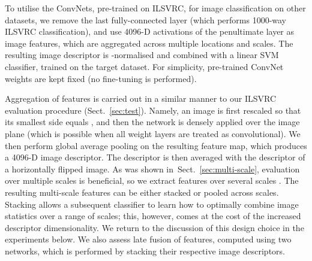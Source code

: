 \documentclass{article} \usepackage{iclr2015,times}
\newcommand{\sref}[1]{Sect.~\ref{#1}}
\begin{document}
To utilise the ConvNets, pre-trained on ILSVRC, for image classification on other datasets, we remove the last fully-connected layer (which performs 1000-way ILSVRC classification), and use 4096-D activations of the penultimate layer as image features, which are aggregated across multiple locations and scales. The resulting image descriptor is -normalised and combined with a linear SVM classifier, trained on the target dataset. For simplicity, pre-trained ConvNet weights are kept fixed (no fine-tuning is performed). 


Aggregation of features is carried out in a similar manner to our ILSVRC evaluation procedure (\sref{sec:test}). Namely, an image is first rescaled so that its smallest side equals , and then the network is densely applied over the image plane (which is possible when all weight layers are treated as convolutional). We then perform global average pooling on the resulting feature map, which produces a 4096-D image descriptor. The descriptor is then averaged with the descriptor of a horizontally flipped image.
As was shown in~\sref{sec:multi-scale}, evaluation over multiple scales is beneficial, so we extract features over several scales .
The resulting multi-scale features can be either stacked or pooled across scales.
Stacking allows a subsequent classifier to learn how to optimally combine image statistics over a range of scales; this, however, comes at the cost of the increased descriptor dimensionality.
We return to the discussion of this design choice in the experiments below.
We also assess late fusion of features, computed using two networks, which is performed by stacking their respective image descriptors.
\end{document}
